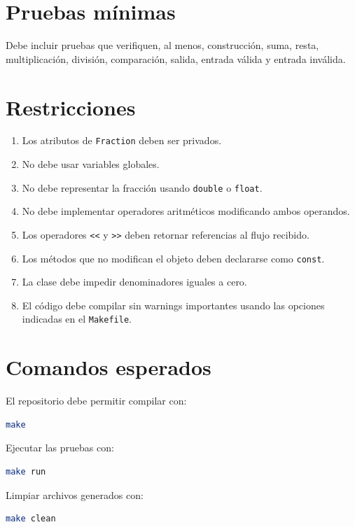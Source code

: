 \documentclass[11pt,a4paper]{article}
\begin{document}
\section{Pruebas mínimas}

Debe incluir pruebas que verifiquen, al menos, construcción, suma, resta, multiplicación, división, comparación, salida, entrada válida y entrada inválida.

\section{Restricciones}

\begin{enumerate}
  \item Los atributos de \lstinline|Fraction| deben ser privados.
  \item No debe usar variables globales.
  \item No debe representar la fracción usando \lstinline|double| o \lstinline|float|.
  \item No debe implementar operadores aritméticos modificando ambos operandos.
  \item Los operadores \lstinline|<<| y \lstinline|>>| deben retornar referencias al flujo recibido.
  \item Los métodos que no modifican el objeto deben declararse como \lstinline|const|.
  \item La clase debe impedir denominadores iguales a cero.
  \item El código debe compilar sin warnings importantes usando las opciones indicadas en el \lstinline|Makefile|.
\end{enumerate}

\section{Comandos esperados}

El repositorio debe permitir compilar con:

\begin{lstlisting}[language=bash]
make
\end{lstlisting}

Ejecutar las pruebas con:

\begin{lstlisting}[language=bash]
make run
\end{lstlisting}

Limpiar archivos generados con:

\begin{lstlisting}[language=bash]
make clean
\end{lstlisting}
\end{document}
